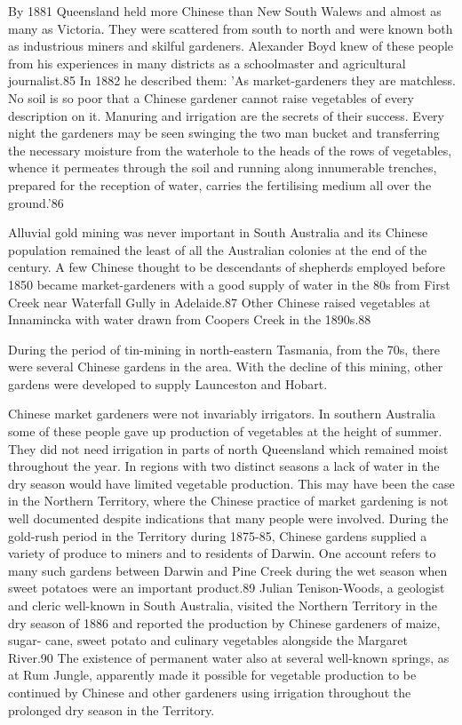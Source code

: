 By 1881 Queensland held more Chinese than New South Walews and almost
as many as Victoria. They were scattered from south to north and were
known both as industrious miners and skilful gardeners. Alexander Boyd
knew of these people from his experiences in many districts as a
schoolmaster and agricultural journalist.85 In 1882 he described them:
'As market-gardeners they are matchless. No soil is so poor that a
Chinese gardener cannot raise vegetables of every description on
it. Manuring and irrigation are the secrets of their success. Every
night the gardeners may be seen swinging the two man bucket and
transferring the necessary moisture from the waterhole to the heads of
the rows of vegetables, whence it permeates through the soil and
running along innumerable trenches, prepared for the reception of
water, carries the fertilising medium all over the ground.'86

Alluvial gold mining was never important in South Australia and its
Chinese population remained the least of all the Australian colonies
at the end of the century. A few Chinese thought to be descendants of
shepherds employed before 1850 became market-gardeners with a good
supply of water in the 80s from First Creek near Waterfall Gully in
Adelaide.87 Other Chinese raised vegetables at Innamincka with water
drawn from Coopers Creek in the 1890s.88

During the period of tin-mining in north-eastern Tasmania, from the
70s, there were several Chinese gardens in the area. With the decline
of this mining, other gardens were developed to supply Launceston and
Hobart.

Chinese market gardeners were not invariably irrigators. In southern
Australia some of these people gave up production of vegetables at the
height of summer. They did not need irrigation in parts of north
Queensland which remained moist throughout the year. In regions with
two distinct seasons a lack of water in the dry season would have
limited vegetable production. This may have been the case in the
Northern Territory, where the Chinese practice of market gardening is
not well documented despite indications that many people were
involved. During the gold-rush period in the Territory during 1875-85,
Chinese gardens supplied a variety of produce to miners and to
residents of Darwin. One account refers to many such gardens between
Darwin and Pine Creek during the wet season when sweet potatoes were
an important product.89 Julian Tenison-Woods, a geologist and cleric
well-known in South Australia, visited the Northern Territory in the
dry season of 1886 and reported the production by Chinese gardeners of
maize, sugar- cane, sweet potato and culinary vegetables alongside the
Margaret River.90 The existence of permanent water also at several
well-known springs, as at Rum Jungle, apparently made it possible for
vegetable production to be continued by Chinese and other gardeners
using irrigation throughout the prolonged dry season in the Territory.

